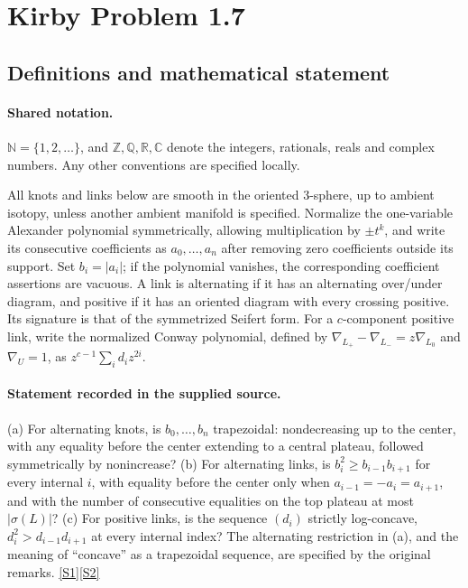 \documentclass[11pt]{article}
\newcommand{\sref}[2]{\hyperlink{source:#1:#2}{[S#2]}}
\begin{document}
\section{Kirby Problem 1.7}\label{statement}

\subsection{Definitions and mathematical statement}

\paragraph{Shared notation.}$\mathbb N=\{1,2,\ldots\}$, and $\mathbb Z,\mathbb Q,\mathbb R,\mathbb C$ denote the integers, rationals, reals and complex numbers. Any other conventions are specified locally.


All knots and links below are smooth in the oriented $3$-sphere, up to ambient isotopy, unless another ambient manifold is specified. Normalize the one-variable Alexander polynomial symmetrically, allowing multiplication by $\pm t^k$, and write its consecutive coefficients as $a_0,\ldots,a_n$ after removing zero coefficients outside its support. Set $b_i=|a_i|$; if the polynomial vanishes, the corresponding coefficient assertions are vacuous. A link is alternating if it has an alternating over/under diagram, and positive if it has an oriented diagram with every crossing positive. Its signature is that of the symmetrized Seifert form. For a $c$-component positive link, write the normalized Conway polynomial, defined by $\nabla_{L_+}-\nabla_{L_-}=z\nabla_{L_0}$ and $\nabla_U=1$, as $z^{c-1}\sum_i d_i z^{2i}$.
\paragraph{Statement recorded in the supplied source.}
(a) For alternating knots, is $b_0,\ldots,b_n$ trapezoidal: nondecreasing up to the center, with any equality before the center extending to a central plateau, followed symmetrically by nonincrease? (b) For alternating links, is $b_i^2\geq b_{i-1}b_{i+1}$ for every internal $i$, with equality before the center only when $a_{i-1}=-a_i=a_{i+1}$, and with the number of consecutive equalities on the top plateau at most $|\sigma(L)|$? (c) For positive links, is the sequence $(d_i)$ strictly log-concave, $d_i^2>d_{i-1}d_{i+1}$ at every internal index? The alternating restriction in (a), and the meaning of ``concave'' as a trapezoidal sequence, are specified by the original remarks. \sref{statement}{1}\sref{statement}{2}
\end{document}
